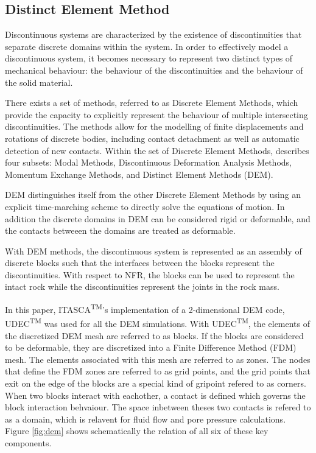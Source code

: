 \subsection{Distinct Element Method}
Discontinuous systems are characterized by the existence of discontinuities that separate discrete domains within the system. In order to effectively model a discontinuous system, it becomes necessary to represent two distinct types of mechanical behaviour: the behaviour of the discontinuities and the behaviour of the solid material.

There exists a set of methods, referred to as Discrete Element Methods, which provide the capacity to explicitly represent the behaviour of multiple intersecting discontinuities. The methods allow for the modelling of finite displacements and rotations of discrete bodies, including contact detachment as well as automatic detection of new contacts. Within the set of Discrete Element Methods, \citet{CUNDALL_1992} describes four subsets: Modal Methods, Discontinuous Deformation Analysis Methods, Momentum Exchange Methods, and Distinct Element Methods (DEM).

DEM distinguishes itself from the other Discrete Element Methods by using an explicit time-marching scheme to directly solve the equations of motion. In addition the discrete domains in DEM can be considered rigid or deformable, and the contacts betweeen the domains are treated as deformable.  


With DEM methods, the discontinuous system is represented as an assembly of discrete blocks such that the interfaces between the blocks represent the discontinuities. With respect to NFR, the blocks can be used to represent the intact rock while the discontinuities represent the joints in the rock mass.  

In this paper, ITASCA\textsuperscript{TM}'s implementation of a 2-dimensional DEM code, UDEC\textsuperscript{TM} was used for all the DEM simulations. With UDEC\textsuperscript{TM}, the elements of the discretized DEM mesh are referred to as blocks. If the blocks are considered to be deformable, they are discretized into a Finite Difference Method (FDM) mesh. The elements associated with this mesh are referred to as zones. The nodes that define the FDM zones are referred to as grid points, and the grid points that exit on the edge of the blocks are a special kind of gripoint refered to as corners. When two blocks interact with eachother, a contact is defined which governs the block interaction behvaiour. The space inbetween theses two contacts is refered to as a domain, which is relavent for fluid flow and pore pressure calculations. Figure \ref{fig:dem} shows schematically the relation of all six of these key components. 
